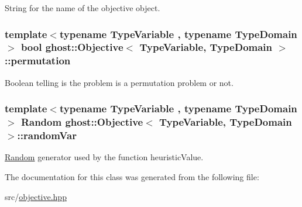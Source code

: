 String for the name of the objective object. 

\subsubsection[{\texorpdfstring{permutation}{permutation}}]{\setlength{\rightskip}{0pt plus 5cm}template$<$typename Type\+Variable , typename Type\+Domain $>$ bool {\bf ghost\+::\+Objective}$<$ Type\+Variable, Type\+Domain $>$\+::permutation\hspace{0.3cm}{\ttfamily [protected]}}\hypertarget{classghost_1_1Objective_aae8345f4b7981f4b386eb58e447e0286}{}\label{classghost_1_1Objective_aae8345f4b7981f4b386eb58e447e0286}


Boolean telling is the problem is a permutation problem or not. 

\subsubsection[{\texorpdfstring{random\+Var}{randomVar}}]{\setlength{\rightskip}{0pt plus 5cm}template$<$typename Type\+Variable , typename Type\+Domain $>$ {\bf Random} {\bf ghost\+::\+Objective}$<$ Type\+Variable, Type\+Domain $>$\+::random\+Var\hspace{0.3cm}{\ttfamily [protected]}}\hypertarget{classghost_1_1Objective_a442da333edc70f47c33a15987c2a81b8}{}\label{classghost_1_1Objective_a442da333edc70f47c33a15987c2a81b8}


\hyperlink{classghost_1_1Random}{Random} generator used by the function heuristic\+Value. 



The documentation for this class was generated from the following file\+:\begin{DoxyCompactItemize}
\item 
src/\hyperlink{objective_8hpp}{objective.\+hpp}\end{DoxyCompactItemize}
